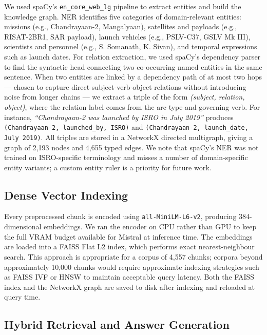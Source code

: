 \documentclass[conference]{IEEEtran}
\begin{document}
We used spaCy's \texttt{en\_core\_web\_lg} pipeline to extract entities and build the knowledge graph. NER identifies five categories of domain-relevant entities: missions (e.g., Chandrayaan-2, Mangalyaan), satellites and payloads (e.g., RISAT-2BR1, SAR payload), launch vehicles (e.g., PSLV-C37, GSLV Mk III), scientists and personnel (e.g., S. Somanath, K. Sivan), and temporal expressions such as launch dates. For relation extraction, we used spaCy's dependency parser to find the syntactic head connecting two co-occurring named entities in the same sentence. When two entities are linked by a dependency path of at most two hops — chosen to capture direct subject-verb-object relations without introducing noise from longer chains — we extract a triple of the form \textit{(subject, relation, object)}, where the relation label comes from the arc type and governing verb. For instance, \textit{``Chandrayaan-2 was launched by ISRO in July 2019''} produces \texttt{(Chandrayaan-2, launched\_by, ISRO)} and \texttt{(Chandrayaan-2, launch\_date, July 2019)}. All triples are stored in a NetworkX directed multigraph, giving a graph of 2,193 nodes and 4,655 typed edges. We note that spaCy's NER was not trained on ISRO-specific terminology and misses a number of domain-specific entity variants; a custom entity ruler is a priority for future work.

\subsection{Dense Vector Indexing}

Every preprocessed chunk is encoded using \texttt{all-MiniLM-L6-v2}, producing 384-dimensional embeddings. We ran the encoder on CPU rather than GPU to keep the full VRAM budget available for Mistral at inference time. The embeddings are loaded into a FAISS Flat L2 index, which performs exact nearest-neighbour search. This approach is appropriate for a corpus of 4,557 chunks; corpora beyond approximately 10,000 chunks would require approximate indexing strategies such as FAISS IVF or HNSW to maintain acceptable query latency. Both the FAISS index and the NetworkX graph are saved to disk after indexing and reloaded at query time.

\subsection{Hybrid Retrieval and Answer Generation}
\end{document}
